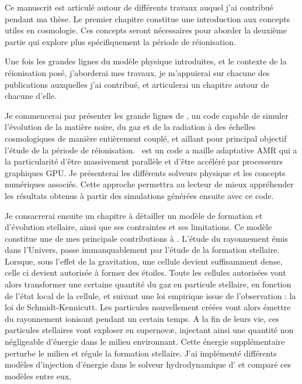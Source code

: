 Ce manuscrit est articulé autour de différents travaux auquel j'ai contribué pendant ma thèse.
Le premier chapitre constitue une introduction aux concepts utiles en cosmologie.
Ces concepts seront nécessaires pour aborder la deuxième partie qui explore plus spécifiquement la période de réionisation.

Une fois les grandes lignes du modèle physique introduites, et le contexte de la réionisation posé, j'aborderai mes travaux.
je m'appuierai sur chacune des publications auxquelles j'ai contribué, et articulerai un chapitre autour de chacune d'elle.  

Je commencerai par présenter les grande lignes de \emma, un code capable de simuler l'évolution de la matière noire, du gaz et de la radiation à des échelles cosmologiques de manière entièrement couplé, et aillant pour principal objectif l'étude de la période de réionisation.
\emma\ est un code a maille adaptative \ac{AMR} qui a la particularité d'être massivement parallèle et d'être accéléré par processeurs graphiques \ac{GPU}.
Je présenterai les différents solveurs physique et les concepts numériques associés.
Cette approche permettra au lecteur de mieux appréhender les résultats obtenus à partir des simulations générées ensuite avec ce code.

Je consacrerai ensuite un chapitre à détailler un modèle de formation et d'évolution stellaire, ainsi que ses contraintes et ses limitations.
Ce modèle constitue une de mes principale contributions à \emma.
L'étude du rayonnement émis dans l'Univers, passe immanquablement par l'étude de la formation stellaire.
Lorsque, sous l'effet de la gravitation, une cellule devient suffisamment dense, celle ci devient autorisée à former des étoiles.
Toute les cellules autorisées vont alors transformer une certaine quantité du gaz en particule stellaire, en fonction de l'état local de la cellule, et suivant une loi empirique issue de l'observation : la loi de Schmidt-Kennicutt.
Les particules nouvellement créées vont alors émettre du rayonnement ionisant pendant un certain temps.
A la fin de leurs vie, ces particules stellaires vont exploser en supernovæ, injectant ainsi une quantité non négligeable d'énergie dans le milieu environnant.
Cette énergie supplémentaire perturbe le milieu et régule la formation stellaire.
J'ai implémenté différents modèles d'injection d'énergie dans le solveur hydrodynamique d'\emma{ } et comparé ces modèles entre eux. 

